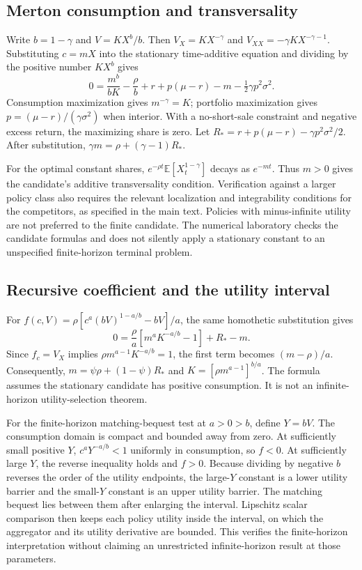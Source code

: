 \documentclass[ecta,draft]{econsocart}
\newcommand{\E}{\mathbb E}
\begin{document}
\subsection{Merton consumption and transversality}
Write $b=1-\gamma$ and $V=KX^b/b$. Then $V_X=KX^{-\gamma}$ and $V_{XX}=-\gamma KX^{-\gamma-1}$. Substituting $c=mX$ into the stationary time-additive equation and dividing by the positive number $KX^b$ gives
\[
 0=\frac{m^b}{bK}-\frac\rho b+r+p(\mu-r)-m-\tfrac12\gamma p^2\sigma^2.
\]
Consumption maximization gives $m^{-\gamma}=K$; portfolio maximization gives $p=(\mu-r)/(\gamma\sigma^2)$ when interior. With a no-short-sale constraint and negative excess return, the maximizing share is zero. Let $R_*=r+p(\mu-r)-\gamma p^2\sigma^2/2$. After substitution, $\gamma m=\rho+(\gamma-1)R_*$.

For the optimal constant shares, $e^{-\rho t}\E[X_t^{1-\gamma}]$ decays as $e^{-m t}$. Thus $m>0$ gives the candidate's additive transversality condition. Verification against a larger policy class also requires the relevant localization and integrability conditions for the competitors, as specified in the main text. Policies with minus-infinite utility are not preferred to the finite candidate. The numerical laboratory checks the candidate formulas and does not silently apply a stationary constant to an unspecified finite-horizon terminal problem.

\subsection{Recursive coefficient and the utility interval}
For $f(c,V)=\rho[c^a(bV)^{1-a/b}-bV]/a$, the same homothetic substitution gives
\[
 0=\frac\rho a[m^aK^{-a/b}-1]+R_*-m.
\]
Since $f_c=V_X$ implies $\rho m^{a-1}K^{-a/b}=1$, the first term becomes $(m-\rho)/a$. Consequently, $m=\psi\rho+(1-\psi)R_*$ and $K=[\rho m^{a-1}]^{b/a}$. The formula assumes the stationary candidate has positive consumption. It is not an infinite-horizon utility-selection theorem.

For the finite-horizon matching-bequest test at $a>0>b$, define $Y=bV$. The consumption domain is compact and bounded away from zero. At sufficiently small positive $Y$, $c^aY^{-a/b}<1$ uniformly in consumption, so $f<0$. At sufficiently large $Y$, the reverse inequality holds and $f>0$. Because dividing by negative $b$ reverses the order of the utility endpoints, the large-$Y$ constant is a lower utility barrier and the small-$Y$ constant is an upper utility barrier. The matching bequest lies between them after enlarging the interval. Lipschitz scalar comparison then keeps each policy utility inside the interval, on which the aggregator and its utility derivative are bounded. This verifies the finite-horizon interpretation without claiming an unrestricted infinite-horizon result at those parameters.
\end{document}
